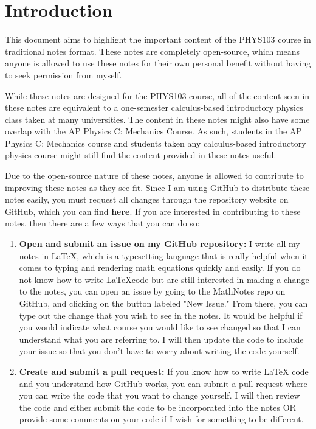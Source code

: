 \documentclass{package/notes}
\begin{document}
\chapter*{Introduction}

This document aims to highlight the important content of the PHYS103 course in traditional notes format. These notes are completely open-source, which means anyone is allowed to use these notes for their own personal benefit without having to seek permission from myself. \newline

While these notes are designed for the PHYS103 course, all of the content seen in these notes are equivalent to a one-semester calculus-based introductory physics class taken at many universities. The content in these notes might also have some overlap with the AP Physics C: Mechanics Course. As such, students in the AP Physics C: Mechanics course and students taken any calculus-based introductory physics course might still find the content provided in these notes useful.\newline

Due to the open-source nature of these notes, anyone is allowed to contribute to improving these notes as they see fit. Since I am using GitHub to distribute these notes easily, you must request all changes through the repository website on GitHub, which you can find \textbf{here}. If you are interested in contributing to these notes, then there are a few ways that you can do so:\newline

\begin{enumerate}
	\item \textbf{Open and submit an issue on my GitHub repository:} I write all my notes in \LaTeX, which is a typesetting language that is really helpful when it comes to typing and rendering math equations quickly and easily. If you do not know how to write \LaTeX code but are still interested in making a change to the notes, you can open an issue by going to the MathNotes repo on GitHub, and clicking on the button labeled "New Issue." From there, you can type out the change that you wish to see in the notes. It would be helpful if you would indicate what course you would like to see changed so that I can understand what you are referring to. I will then update the code to include your issue so that you don't have to worry about writing the code yourself.
	\item \textbf{Create and submit a pull request:} If you know how to write LaTeX code and you understand how GitHub works, you can submit a pull request where you can write the code that you want to change yourself. I will then review the code and either submit the code to be incorporated into the notes OR provide some comments on your code if I wish for something to be different. 
\end{enumerate}\newpage
\end{document}

